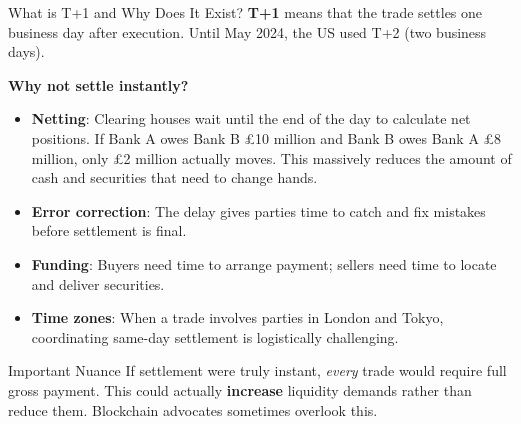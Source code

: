 \documentclass[10pt]{beamer}
\newcommand{\highlight}[1]{\textcolor{AccentOrange}{\textbf{#1}}}
\begin{document}
\begin{frame}{What is T+1 and Why Does It Exist?}
  \highlight{T+1} means that the trade settles one business day after execution. Until May 2024, the US used T+2 (two business days).
  
  \vspace{0.5em}
  \textbf{Why not settle instantly?}
  \begin{itemize}
    \item \textbf{Netting}: Clearing houses wait until the end of the day to calculate net positions. If Bank A owes Bank B \pounds 10 million and Bank B owes Bank A \pounds 8 million, only \pounds 2 million actually moves. This massively reduces the amount of cash and securities that need to change hands.
    \item \textbf{Error correction}: The delay gives parties time to catch and fix mistakes before settlement is final.
    \item \textbf{Funding}: Buyers need time to arrange payment; sellers need time to locate and deliver securities.
    \item \textbf{Time zones}: When a trade involves parties in London and Tokyo, coordinating same-day settlement is logistically challenging.
  \end{itemize}
  
  \vspace{0.5em}
  \begin{block}{Important Nuance}
  If settlement were truly instant, \textit{every} trade would require full gross payment. This could actually \highlight{increase} liquidity demands rather than reduce them. Blockchain advocates sometimes overlook this.
  \end{block}
\end{frame}
\end{document}
